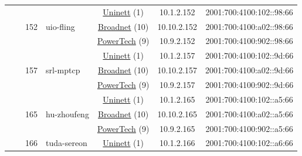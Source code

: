 \begin{small}
\begin{center}
\begin{longtable}{|c|c|c|c|c|c|c|c|}
  &  & \multirow{3}{*}{\tiny{152}} & \multicolumn{1}{|l|}{\multirow{3}{*}{\tiny{uio-fling}}} & \multicolumn{2}{|c|}{\tiny{\href{https://www.uninett.no}{Uninett} (1)}} & \tiny{10.1.2.152} & \tiny{2001:700:4100:102::98:66} \\* \cline{5-5}\cline{6-6}\cline{7-7}\cline{8-8}
  &  &  &  & \multicolumn{2}{|c|}{\tiny{\href{https://www.broadnet.no}{Broadnet} (10)}} & \tiny{10.10.2.152} & \tiny{2001:700:4100:a02::98:66} \\* \cline{5-5}\cline{6-6}\cline{7-7}\cline{8-8}
  &  &  &  & \multicolumn{2}{|c|}{\tiny{\href{http://www.powertech.no}{PowerTech} (9)}} & \tiny{10.9.2.152} & \tiny{2001:700:4100:902::98:66} \\* \cline{3-3}\cline{4-4}\cline{5-5}\cline{6-6}\cline{7-7}\cline{8-8}
  &  & \multirow{3}{*}{\tiny{157}} & \multicolumn{1}{|l|}{\multirow{3}{*}{\tiny{srl-mptcp}}} & \multicolumn{2}{|c|}{\tiny{\href{https://www.uninett.no}{Uninett} (1)}} & \tiny{10.1.2.157} & \tiny{2001:700:4100:102::9d:66} \\* \cline{5-5}\cline{6-6}\cline{7-7}\cline{8-8}
  &  &  &  & \multicolumn{2}{|c|}{\tiny{\href{https://www.broadnet.no}{Broadnet} (10)}} & \tiny{10.10.2.157} & \tiny{2001:700:4100:a02::9d:66} \\* \cline{5-5}\cline{6-6}\cline{7-7}\cline{8-8}
  &  &  &  & \multicolumn{2}{|c|}{\tiny{\href{http://www.powertech.no}{PowerTech} (9)}} & \tiny{10.9.2.157} & \tiny{2001:700:4100:902::9d:66} \\* \cline{3-3}\cline{4-4}\cline{5-5}\cline{6-6}\cline{7-7}\cline{8-8}
  &  & \multirow{3}{*}{\tiny{165}} & \multicolumn{1}{|l|}{\multirow{3}{*}{\tiny{hu-zhoufeng}}} & \multicolumn{2}{|c|}{\tiny{\href{https://www.uninett.no}{Uninett} (1)}} & \tiny{10.1.2.165} & \tiny{2001:700:4100:102::a5:66} \\* \cline{5-5}\cline{6-6}\cline{7-7}\cline{8-8}
  &  &  &  & \multicolumn{2}{|c|}{\tiny{\href{https://www.broadnet.no}{Broadnet} (10)}} & \tiny{10.10.2.165} & \tiny{2001:700:4100:a02::a5:66} \\* \cline{5-5}\cline{6-6}\cline{7-7}\cline{8-8}
  &  &  &  & \multicolumn{2}{|c|}{\tiny{\href{http://www.powertech.no}{PowerTech} (9)}} & \tiny{10.9.2.165} & \tiny{2001:700:4100:902::a5:66} \\* \cline{3-3}\cline{4-4}\cline{5-5}\cline{6-6}\cline{7-7}\cline{8-8}
  &  & \multirow{3}{*}{\tiny{166}} & \multicolumn{1}{|l|}{\multirow{3}{*}{\tiny{tuda-sereon}}} & \multicolumn{2}{|c|}{\tiny{\href{https://www.uninett.no}{Uninett} (1)}} & \tiny{10.1.2.166} & \tiny{2001:700:4100:102::a6:66} \\* \cline{5-5}\cline{6-6}\cline{7-7}\cline{8-8}

\end{longtable}
\end{center}
\end{small}
